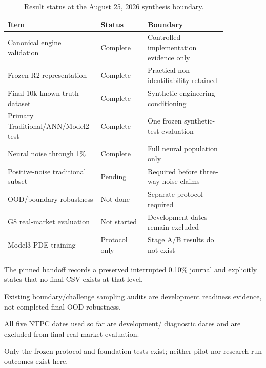 \begin{table}[htbp]
\centering
\caption{Result status at the August 25, 2026 synthesis boundary.}
\label{tab:result-status}
\begin{tabular}{p{0.31\linewidth}p{0.20\linewidth}p{0.34\linewidth}}
\toprule
Item & Status & Boundary \\
\midrule
Canonical engine validation & Complete & Controlled implementation evidence only \\
Frozen R2 representation & Complete & Practical non-identifiability retained \\
Final 10k known-truth dataset & Complete & Synthetic engineering conditioning \\
Primary Traditional/ANN/Model2 test & Complete & One frozen synthetic-test evaluation \\
Neural noise through 1\% & Complete & Full neural population only \\
Positive-noise traditional subset & Pending & Required before three-way noise claims \\
OOD/boundary robustness & Not done & Separate protocol required \\
G8 real-market evaluation & Not started & Development dates remain excluded \\
Model3 PDE training & Protocol only & Stage A/B results do not exist \\
\bottomrule
\end{tabular}
\end{table}

 The pinned handoff
records a preserved interrupted 0.10\% journal and explicitly states that no final CSV
exists at that level.

 Existing boundary/challenge sampling audits are
development readiness evidence, not completed final OOD robustness.

 All five NTPC dates used so far are development/
diagnostic dates and are excluded from final real-market evaluation.

 Only the frozen protocol and foundation tests
exist; neither pilot nor research-run outcomes exist here.
